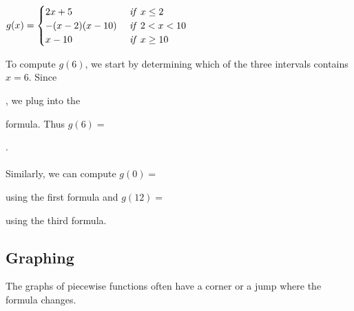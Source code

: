 \documentclass{ximera}
\begin{document}
\begin{example}
$g(x)=\begin{cases} 2x+5 & \mbox{ \emph{if} }x\leq 2\\ -(x-2)(x-10) & \mbox{ \emph{if} } 2<x<10\\ x-10 & \mbox{ \emph{if} } x\geq 10\end{cases}$

To compute $g(6)$, we start by determining which of the three intervals contains $x=6$. Since 
\begin{multipleChoice}
  \end{multipleChoice}
  , we plug into the 
  \begin{multipleChoice}
  \end{multipleChoice}
formula. Thus $g(6)=$
\begin{multipleChoice}
  \end{multipleChoice}.\\
\\Similarly, we can compute $g(0)=$
\begin{multipleChoice}
  \end{multipleChoice} using the first formula and $g(12)=$ 
  \begin{multipleChoice}
  \end{multipleChoice}using the third formula.
\end{example}



\subsection*{Graphing}
The graphs of piecewise functions often have a corner or a jump where the formula changes. 
\end{document}
